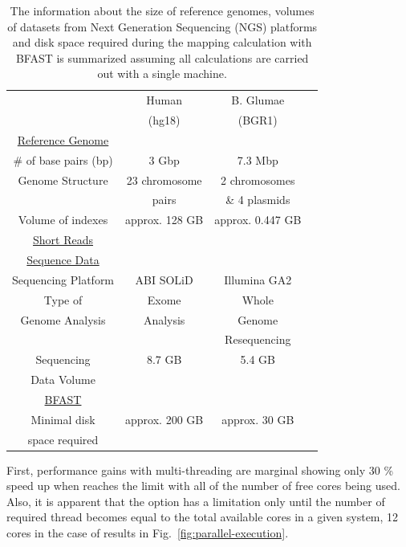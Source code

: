 \documentclass{acm_proc_article-sp}
\begin{document}
\begin{table}
\small
\begin{tabular}{|c|c|c|c|} 
  \hline 
   & Human & B. Glumae   \\ 
& (hg18) & (BGR1)\\   
   
   \hline \hline
 \underline{Reference Genome} & &  \\
    \# of base pairs (bp) &  3 Gbp & 7.3 Mbp \\ \hline
   Genome Structure &   23 chromosome  & 2 chromosomes  \\  
   &   pairs & \& 4 plasmids \\ \hline
    Volume of indexes  & approx. 128 GB  & approx. 0.447 GB  \\ 
      \hline \hline
    \underline{Short Reads} & &   \\
        \underline{Sequence Data}& &    \\
          Sequencing Platform & ABI SOLiD  &  Illumina GA2 \\ \hline
  Type of  &  Exome  & Whole \\ 
  
Genome Analysis  & Analysis &  Genome \\
&& Resequencing \\  \hline

  Sequencing   & 8.7 GB & 5.4 GB \\
  Data Volume&&\\
  
  
  \hline  \hline
  \underline{BFAST} & &  \\
  Minimal disk &  approx. 200 GB   &    approx. 30 GB   \\
space required & &\\
\hline  \hline
\end{tabular} \caption{The information about the size of reference genomes, volumes of datasets from
 Next Generation Sequencing (NGS) platforms and disk space required during the mapping calculation 
 with BFAST is summarized assuming all calculations are carried out with a single machine.}
 \label{table:two-genomes} 
\end{table}
First, performance gains with multi-threading are marginal showing only 30 \% speed up when reaches the 
limit with all of the number of free cores being used.  Also, it is apparent that the option has a limitation only
until the number of required thread becomes equal to the total available cores in a given system, 
12 cores in the case of results in Fig.~\ref{fig:parallel-execution}.
\end{document}
